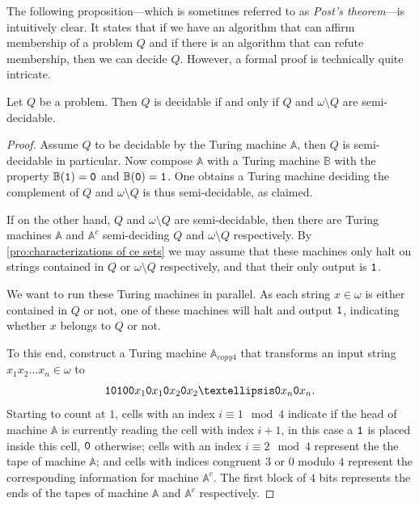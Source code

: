

The following proposition---which is sometimes referred to as \emph{Post's
theorem}---is intuitively clear. It states that if we have an algorithm
that can affirm membership of a problem \(Q\) and if there is an algorithm that
can refute membership, then we can decide \(Q\). However, a formal proof is
technically quite intricate.

\begin{pro}\label{pro:Posts theorem}
  Let \(Q\) be a problem. Then \(Q\) is decidable if and only if \(Q\) and \(ω
  \setminus Q\) are semi-decidable.
\end{pro}
\begin{proof}
  Assume \(Q\) to be decidable by the Turing machine \(\mathbb{A}\), then \(Q\)
  is semi-decidable in particular. Now compose \(\mathbb{A}\) with a Turing
  machine \(\mathbb{B}\) with the property \(\mathbb{B}(\mathtt{1}) = \mathtt{0}\) and
  \(\mathbb{B}(\mathtt{0}) = \mathtt{1}\). One obtains a Turing machine deciding the
  complement of \(Q\) and \(ω \setminus Q\) is thus semi-decidable, as claimed.

  If on the other hand, \(Q\) and \(ω \setminus Q\) are semi-decidable, then
  there are Turing machines \(\mathbb{A}\) and \(\mathbb{A}^c\) semi-deciding
  \(Q\) and \(ω \setminus Q\) respectively. By \cref{pro:characterizations of ce
  sets} we may assume that these machines only halt on strings contained in
  \(Q\) or \(ω \setminus Q\) respectively, and that their only output is
  \(\mathtt{1}\).

  We want to run these Turing machines in parallel. As each string \(x ∈ ω\) is
  either contained in \(Q\) or not, one of these machines will halt and output
  \(\mathtt{1}\), indicating whether \(x\) belongs to \(Q\) or not.

  To this end, construct a Turing machine \(\mathbb{A}_{copy4}\) that transforms
  an input string \(x_1x_2 … x_n ∈ ω\) to
  \[
    \one\zer\one\zer \zer x_1 \zer x_1 \zer x_2 \zer x_2 … \zer x_n \zer x_n.
  \]
  Starting to count at \(1\), cells with an index \(i \equiv 1 \mod 4\) indicate
  if the head of machine \(\mathbb{A}\) is currently reading the cell with index
  \(i + 1\), in this case a \(\mathtt{1}\) is placed inside this cell, \(\mathtt{0}\)
  otherwise; cells with an index \(i \equiv 2 \mod 4\) represent the the tape
  of machine \(\mathbb{A}\); and cells with indices congruent \(3\) or \(0\)
  modulo \(4\) represent the corresponding information for machine
  \(\mathbb{A}^c\). The first block of \(4\) bits represents the ends of the
  tapes of machine \(\mathbb{A}\) and \(\mathbb{A}^c\) respectively.


\end{proof}
